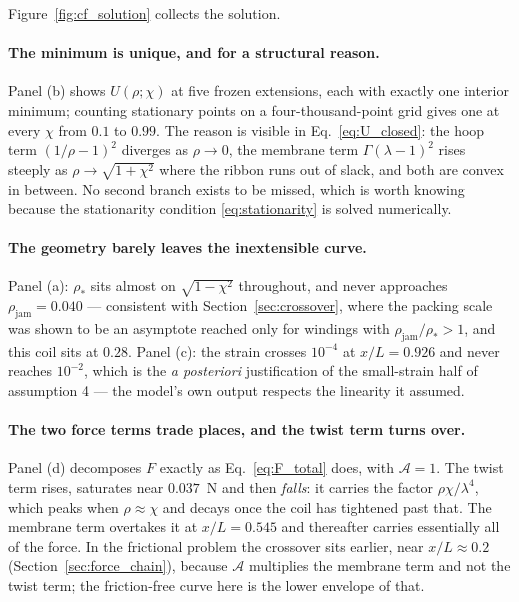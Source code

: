 \documentclass[11pt]{article}
\begin{document}
Figure~\ref{fig:cf_solution} collects the solution.

\paragraph{The minimum is unique, and for a structural reason.} Panel (b) shows
$U\left(\rho;\chi\right)$ at five frozen extensions, each with exactly one
interior minimum; counting stationary points on a four-thousand-point grid gives
one at every $\chi$ from $0.1$ to $0.99$. The reason is visible in
Eq.~\eqref{eq:U_closed}: the hoop term $\left(1/\rho-1\right)^{2}$ diverges as
$\rho \to 0$, the membrane term $\Gamma\left(\lambda-1\right)^{2}$ rises steeply
as $\rho \to \sqrt{1+\chi^{2}}$ where the ribbon runs out of slack, and both are
convex in between. No second branch exists to be missed, which is worth knowing
because the stationarity condition \eqref{eq:stationarity} is solved
numerically.

\paragraph{The geometry barely leaves the inextensible curve.} Panel (a):
$\rho_{*}$ sits almost on $\sqrt{1-\chi^{2}}$ throughout, and never approaches
$\rho_{\mathrm{jam}} = 0.040$ --- consistent with
Section~\ref{sec:crossover}, where the packing scale was shown to be an
asymptote reached only for windings with $\rho_{\mathrm{jam}}/\rho_{*} > 1$, and
this coil sits at $0.28$. Panel (c): the strain crosses $10^{-4}$ at
$x/L = 0.926$ and never reaches $10^{-2}$, which is the \emph{a posteriori}
justification of the small-strain half of assumption 4 --- the model's own output
respects the linearity it assumed.

\paragraph{The two force terms trade places, and the twist term turns over.}
Panel (d) decomposes $F$ exactly as Eq.~\eqref{eq:F_total} does, with
$\mathcal{A} = 1$. The twist term rises, saturates near $0.037$~N and then
\emph{falls}: it carries the factor $\rho\chi/\lambda^{4}$, which peaks when
$\rho \approx \chi$ and decays once the coil has tightened past that. The
membrane term overtakes it at $x/L = 0.545$ and thereafter carries essentially
all of the force. In the frictional problem the crossover sits earlier, near
$x/L \approx 0.2$ (Section~\ref{sec:force_chain}), because $\mathcal{A}$
multiplies the membrane term and not the twist term; the friction-free curve here
is the lower envelope of that.
\end{document}
